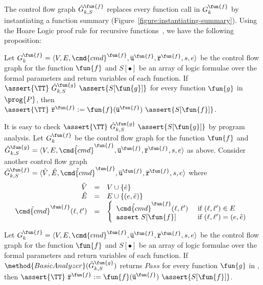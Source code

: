 The control flow graph $\hat{G}^{\fun{f}}_{k,S}$ replaces every
function call in $G_k^\fun{f}$ by instantiating a function
summary (Figure~\ref{figure:instantiating-summary}).
Using the Hoare Logic proof rule for recursive functions~\cite{Oheimb99}, we have the
following proposition:
\begin{proposition}
  \label{proposition:check_summary}
  Let $G^\fun{f}_k = \langle V, E, \cmd{cmd}^\fun{f}, \overline{\mathtt{u}}^\fun{f}, \overline{\mathtt{r}}^\fun{f},s,e \rangle$ be the control flow graph for the function
  $\fun{f}$ and $S[\bullet]$ be an array of logic formulae over the formal
  parameters and return variables of each function. If $\assert{\TT}\
  \hat{G}^\fun{g}_{k,S}\ \assert{S[\fun{g}]}$ for every
  function $\fun{g}$ in $\prog{P}$, then $\assert{\TT}\ \overline{\mathtt{r}}^\fun{f} :=
  \fun{f} (\overline{\mathtt{u}}^\fun{f})\ \assert{S[\fun{f}]}$.
\end{proposition}

It is easy to check $\assert{\TT}\ \hat{G}^\fun{g}_{k,S}\
\assert{S[\fun{g}]}$ by program analysis. Let $G_k^{\fun{f}}$ be
the control flow graph for the function $\fun{f}$ and
$\hat{G}^\fun{g}_{k,S} = \langle V, E, \hat{\cmd{cmd}}^\fun{f}, \overline{\mathtt{u}}^\fun{f}, \overline{\mathtt{r}}^\fun{f},s,e \rangle$ as
above. Consider another control flow graph $\tilde{G}^\fun{f}_{k,S} =
\langle \tilde{V}, \tilde{E}, \tilde{\cmd{cmd}}^\fun{f} , \overline{\mathtt{u}}^\fun{f}, \overline{\mathtt{r}}^\fun{f},s,e \rangle$ where
\begin{equation*}
  \begin{array}{rcl}
    \tilde{V} & = & V \cup \{ \tilde{e} \}\\
    \tilde{E} & = & E \cup \{ (e, \tilde{e}) \}\\
    \tilde{\cmd{cmd}}^\fun{f} (\ell, \ell') & = &
    \left\{
      \begin{array}{ll}
        \hat{\cmd{cmd}}^\fun{f} (\ell, \ell') &
        \text{ if } (\ell, \ell') \in E\\
        \mathtt{assert\ } S[\fun{f}] &
        \text{ if } (\ell, \ell') = (e, \tilde{e})
      \end{array}
    \right.
  \end{array}
\end{equation*}

\pagebreak
\begin{corollary}
  Let $G^\fun{f}_k = \langle V, E, \cmd{cmd}^\fun{f}, \overline{\mathtt{u}}^\fun{f}, \overline{\mathtt{r}}^\fun{f},s,e \rangle$ be the control flow graph for the function
  $\fun{f}$ and $S[\bullet]$ be an array of logic formulae over the formal
  parameters and return variables of each function. If $\method{BasicAnalyzer}
  (\tilde{G}^\fun{g}_{k,S})$ returns $\mathit{Pass}$ for every function
  $\fun{g}$ in \prog{P}, then $\assert{\TT}\ \overline{\mathtt{r}}^\fun{f} :=
  \fun{f} (\overline{\mathtt{u}}^\fun{f})\ \assert{S[\fun{f}]}$.
  \label{corollary:check-summary}
\end{corollary}


